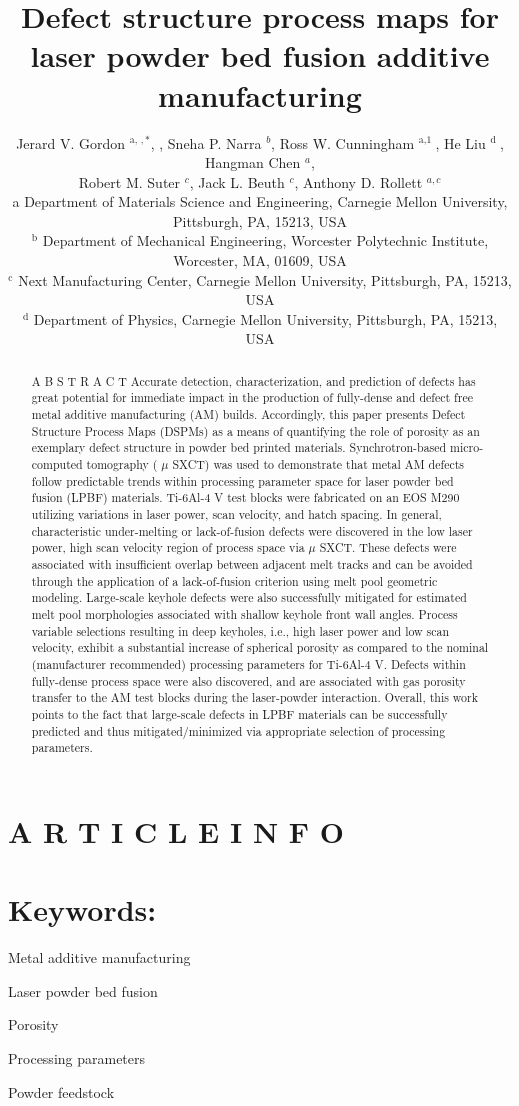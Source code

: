\documentclass[10pt]{article}
\title{Defect structure process maps for laser powder bed fusion additive manufacturing }
\author{Jerard V. Gordon ${ }^{\text {a, }, *}$, , Sneha P. Narra ${ }^{b}$, Ross W. Cunningham ${ }^{\text {a,1 }}$, He Liu ${ }^{\text {d }}$, Hangman Chen ${ }^{a}$,\\
Robert M. Suter ${ }^{c}$, Jack L. Beuth ${ }^{c}$, Anthony D. Rollett ${ }^{a, c}$\\
a Department of Materials Science and Engineering, Carnegie Mellon University, Pittsburgh, PA, 15213, USA\\
${ }^{\mathrm{b}}$ Department of Mechanical Engineering, Worcester Polytechnic Institute, Worcester, MA, 01609, USA\\
${ }^{\mathrm{c}}$ Next Manufacturing Center, Carnegie Mellon University, Pittsburgh, PA, 15213, USA\\
${ }^{\mathrm{d}}$ Department of Physics, Carnegie Mellon University, Pittsburgh, PA, 15213, USA}
\date{}
\begin{document}
\maketitle


\section*{A R T I C L E I N F O}
\section*{Keywords:}
Metal additive manufacturing

Laser powder bed fusion

Porosity

Processing parameters

Powder feedstock

\begin{abstract}
A B S T R A C T Accurate detection, characterization, and prediction of defects has great potential for immediate impact in the production of fully-dense and defect free metal additive manufacturing (AM) builds. Accordingly, this paper presents Defect Structure Process Maps (DSPMs) as a means of quantifying the role of porosity as an exemplary defect structure in powder bed printed materials. Synchrotron-based micro-computed tomography ( $\mu$ SXCT) was used to demonstrate that metal AM defects follow predictable trends within processing parameter space for laser powder bed fusion (LPBF) materials. Ti-6Al-4 V test blocks were fabricated on an EOS M290 utilizing variations in laser power, scan velocity, and hatch spacing. In general, characteristic under-melting or lack-of-fusion defects were discovered in the low laser power, high scan velocity region of process space via $\mu$ SXCT. These defects were associated with insufficient overlap between adjacent melt tracks and can be avoided through the application of a lack-of-fusion criterion using melt pool geometric modeling. Large-scale keyhole defects were also successfully mitigated for estimated melt pool morphologies associated with shallow keyhole front wall angles. Process variable selections resulting in deep keyholes, i.e., high laser power and low scan velocity, exhibit a substantial increase of spherical porosity as compared to the nominal (manufacturer recommended) processing parameters for Ti-6Al-4 V. Defects within fully-dense process space were also discovered, and are associated with gas porosity transfer to the AM test blocks during the laser-powder interaction. Overall, this work points to the fact that large-scale defects in LPBF materials can be successfully predicted and thus mitigated/minimized via appropriate selection of processing parameters.
\end{abstract}
\end{document}
